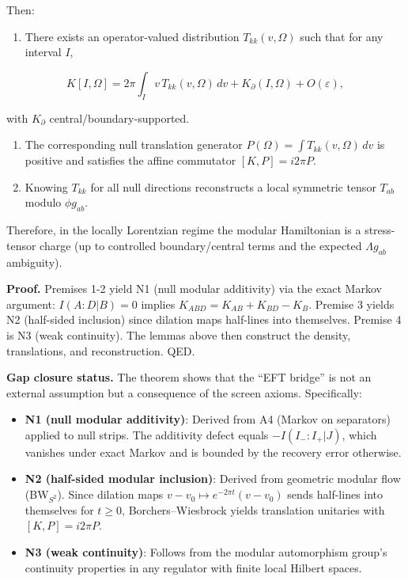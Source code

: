 \documentclass[11pt,a4paper]{article}
\theoremstyle{remark}
\providecommand{\tightlist}{%
  \setlength{\itemsep}{0pt}\setlength{\parskip}{0pt}}
\begin{document}
Then:

\begin{enumerate}
\def\labelenumi{(\alph{enumi})}
\tightlist
\item
  There exists an operator-valued distribution \(T_{kk}(v,\Omega)\) such
  that for any interval \(I\),
\end{enumerate}

\[
K[I,\Omega] = 2\pi \int_I v \, T_{kk}(v,\Omega) \, dv + K_\partial(I,\Omega) + O(\varepsilon),
\]

with \(K_\partial\) central/boundary-supported.

\begin{enumerate}
\def\labelenumi{(\alph{enumi})}
\setcounter{enumi}{1}
\item
  The corresponding null translation generator
  \(P(\Omega) = \int T_{kk}(v,\Omega) \, dv\) is positive and satisfies
  the affine commutator \([K,P] = i 2\pi P\).
\item
  Knowing \(T_{kk}\) for all null directions reconstructs a local
  symmetric tensor \(T_{ab}\) modulo \(\phi g_{ab}\).
\end{enumerate}

Therefore, in the locally Lorentzian regime the modular Hamiltonian is a
stress-tensor charge (up to controlled boundary/central terms and the
expected \(\Lambda g_{ab}\) ambiguity).

\textbf{Proof.} Premises 1-2 yield N1 (null modular additivity) via the exact
Markov argument: \(I(A:D|B)=0\) implies \(K_{ABD} = K_{AB} + K_{BD} - K_B\).
Premise 3 yields N2 (half-sided inclusion) since dilation maps half-lines
into themselves. Premise 4 is N3 (weak continuity). The lemmas above then
construct the density, translations, and reconstruction. QED.

\textbf{Gap closure status.} The theorem shows that the ``EFT bridge'' is not an
external assumption but a consequence of the screen axioms. Specifically:

\begin{itemize}
\item
  \textbf{N1 (null modular additivity)}: Derived from A4 (Markov on separators)
  applied to null strips. The additivity defect equals \(-I(I_-:I_+|J)\),
  which vanishes under exact Markov and is bounded by the recovery error
  otherwise.
\item
  \textbf{N2 (half-sided modular inclusion)}: Derived from geometric modular flow
  (BW\(_{S^2}\)). Since dilation maps \(v - v_0 \mapsto e^{-2\pi t}(v - v_0)\)
  sends half-lines into themselves for \(t \ge 0\), Borchers--Wiesbrock yields
  translation unitaries with \([K, P] = i2\pi P\).
\item
  \textbf{N3 (weak continuity)}: Follows from the modular automorphism group's
  continuity properties in any regulator with finite local Hilbert spaces.
\end{itemize}
\end{document}
